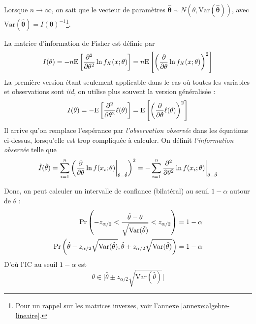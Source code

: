 \documentclass[12pt, french]{report}
\begin{document}
Lorsque $n \to \infty$, on sait que le vecteur de paramètres $\bm{\hat{\theta}} \sim N(\theta, \mathrm{Var}(\bm{\hat{\theta}}))$, avec $\mathrm{Var}(\bm{\hat{\theta}}) = I(\bm{\theta})^{-1}$\footnote{Pour un rappel sur les matrices inverses, voir l'annexe \ref{annexe:algebre-lineaire}.}.

\begin{definition}
La matrice d'information de Fisher est définie par
\begin{equation}
I(\theta) = -n \mathrm{E} \left[ \frac{\partial^2}{\partial \theta^2} \ln f_X(x ; \theta) \right] = n \mathrm{E} \left[ \left( \frac{\partial}{\partial \theta} \ln f_X(x ; \theta) \right)^2 \right]
\end{equation}
La première version étant seulement applicable dans le cas où toutes les variables et observations sont \emph{iid}, on utilise plus souvent la version généralisée : 
\begin{equation}
I(\theta) = -\mathrm{E} \left[ \frac{\partial^2}{\partial \theta^2} \ell(\theta) \right] = \mathrm{E} \left[ \left( \frac{\partial}{\partial \theta} \ell(\theta) \right)^2 \right]
\end{equation}
Il arrive qu'on remplace l'espérance par \emph{l'observation observée} dans les équations ci-dessus, lorsqu'elle est trop compliquée à calculer. On définit \emph{l'information observée} telle que
\begin{equation}
\hat{I}(\hat{\theta}) = \sum_{i=1}^{n} \left( \frac{\partial}{\partial \theta} \ln f(x_i ; \theta) \biggr \rvert_{\theta = \hat{\theta}} \right)^2 = - \sum_{i=1}^{n}  \frac{\partial^2}{\partial \theta^2} \ln f(x_i ; \theta) \biggr \rvert_{\theta = \hat{\theta}}
\end{equation}


\end{definition}

Donc, on peut calculer un intervalle de confiance (bilatéral) au seuil $1-\alpha$ autour de $\theta$ : 
\begin{align*}
\Pr \left( -z_{\alpha/2} < \frac{\hat{\theta} - \theta}{\sqrt{\mathrm{Var}(\hat{\theta})}}  < z_{ \alpha/2}  \right) & = 1 - \alpha \\
\Pr \left( \hat{\theta} - z_{\alpha/2} \sqrt{\mathrm{Var}(\hat{\theta})}, \hat{\theta} + z_{\alpha/2} \sqrt{\mathrm{Var}(\hat{\theta})} \right) & = 1 - \alpha \\
\end{align*}
D'où l'IC au seuil $1 - \alpha$ est
\begin{equation}
\theta \in \Big [   \hat{\theta} \pm z_{\alpha/2} \sqrt{\mathrm{Var}(\hat{\theta})} \Big ]
\end{equation}
\end{document}
